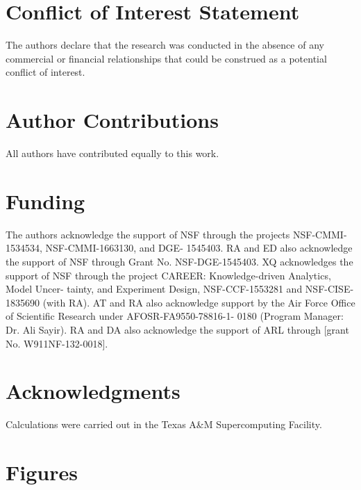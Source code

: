 \documentclass[utf8]{frontiersSCNS} %
\begin{document}
\section{Conflict of Interest Statement}

The authors declare that the research was conducted in the absence of any commercial or financial relationships that could be construed as a potential conflict of interest.

\section{Author Contributions}
All authors have contributed equally to this work.
\section{Funding}

The authors acknowledge the support of NSF through the projects NSF-CMMI-1534534, NSF-CMMI-1663130, and DGE- 1545403. RA and ED also acknowledge the support of NSF through Grant No. NSF-DGE-1545403. XQ acknowledges the support of NSF through the project CAREER: Knowledge-driven Analytics, Model Uncer- tainty, and Experiment Design, NSF-CCF-1553281 and NSF-CISE-1835690 (with RA). AT and RA also acknowledge support by the Air Force Office of Scientific Research under AFOSR-FA9550-78816-1- 0180 (Program Manager: Dr. Ali Sayir). RA and DA also acknowledge the support of ARL through [grant No. W911NF-132-0018]. 

\section{Acknowledgments}
Calculations were carried out in the Texas A\&M Supercomputing Facility.

 



\section{Figures}
\end{document}
